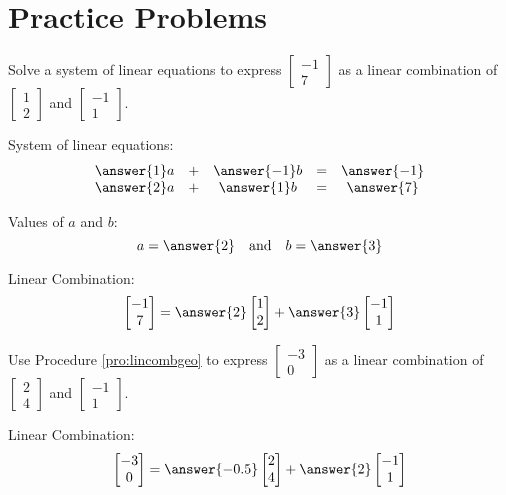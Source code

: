 \documentclass{ximera}
\begin{document}
\section*{Practice Problems}
\begin{problem}\label{prob:lincombtwovectors1}
Solve a system of linear equations to express $\begin{bmatrix}-1\\7\end{bmatrix}$ as a linear combination of $\begin{bmatrix}1\\2\end{bmatrix}$ and $\begin{bmatrix}-1\\1\end{bmatrix}$.

System of linear equations:
$$\begin{array}{ccccc}
      \answer{1}a & +&\answer{-1}b&= &\answer{-1} \\
	 \answer{2}a& +&\answer{1}b&=&\answer{7}
    \end{array}$$
    
    Values of $a$ and $b$:
    $$a=\answer{2}\quad\text{and}\quad b=\answer{3}$$
    
    Linear Combination:
    $$\begin{bmatrix}-1\\7\end{bmatrix}=\answer{2}\begin{bmatrix}1\\2\end{bmatrix}+\answer{3}\begin{bmatrix}-1\\1\end{bmatrix}$$

\end{problem}


\begin{problem}\label{prob:lincombtwovectors2}
Use Procedure \ref{pro:lincombgeo} to express $\begin{bmatrix}-3\\0\end{bmatrix}$ as a linear combination of $\begin{bmatrix}2\\4\end{bmatrix}$ and $\begin{bmatrix}-1\\1\end{bmatrix}$.

Linear Combination:
$$\begin{bmatrix}-3\\0\end{bmatrix}=\answer{-0.5}\begin{bmatrix}2\\4\end{bmatrix}+\answer{2}\begin{bmatrix}-1\\1\end{bmatrix}$$
\end{problem}
\end{document}
